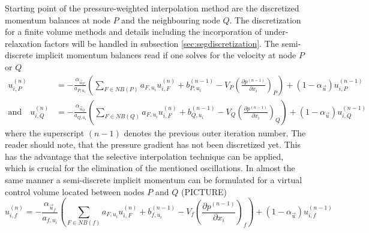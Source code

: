   Starting point of the pressure-weighted interpolation method are the discretized momentum balances at node \(P\) and the neighbouring node \(Q\). The discretization for a finite volume methods and details including the incorporation of under-relaxation factors will be handled in subsection \ref{sec:segdiscretization}. The semi-discrete implicit momentum balances read if one solves for the velocity at node \(P\) or \(Q\)
  \begin{subequations}
  \begin{align}
    u_{i,P}^{(n)} 
    &= 
    - \frac{\alpha_{\vec{u}_P}}{a_{P,u_i}} \left(\sum_{F \in NB(P)} a_{F,u_i} u_{i,F}^{(n)}
    +                                     b_{P,u_i}^{(n-1)} 
    -                                     V_P\left(\frac{\partial p^{(n-1)}}{\partial x_i}\right)_P \right)
    + \left(1 - \alpha_{\vec{u}}\right) u_{i,P}^{(n-1)}  \\[1em]
    \text{and} \quad
    u_{i,Q}^{(n)} 
    &= 
    - \frac{\alpha_{\vec{u}_Q}}{a_{Q,u_i}} \left(\sum_{F \in NB(Q)} a_{F,u_i} u_{i,F}^{(n)}
    +                                     b_{Q,u_i}^{(n-1)} 
    -                                     V_Q\left(\frac{\partial p^{(n-1)}}{\partial x_i}\right)_Q   \right)
    + \left(1 - \alpha_{\vec{u}}\right) u_{i,Q}^{(n-1)}
  \end{align}
  \end{subequations}
  where the superscript \((n-1)\) denotes the previous outer iteration number. The reader should note, that the pressure gradient has not been discretized yet. This has the advantage that the selective interpolation technique \cite{schaefernumbe} can be applied, which is crucial for the elimination of the mentioned oscillations. In almost the same manner a semi-discrete implicit momentum can be formulated for a virtual control volume located between nodes \(P\) and \(Q\) (PICTURE)
  \begin{equation}
    \label{eq:virtualu}
    u_{i,f}^{(n)} 
    = 
    - \frac{\alpha_{\vec{u}_f}}{a_{f,u_i}} \left(\sum_{F \in NB(f)} a_{F,u_i} u_{i,F}^{(n)} 
    +                                     b_{f,u_i}^{(n-1)} 
    -                                     V_f\left(\frac{\partial p^{(n-1)}}{\partial x_i}\right)_f  \right)
    + \left(1 - \alpha_{\vec{u}}\right) u_{i,f}^{(n-1)} 
  \end{equation}
  
